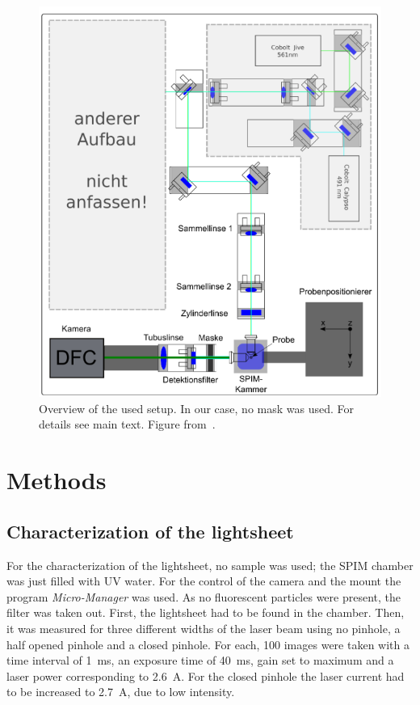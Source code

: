 \begin{figure}[ht]
    \centering
    \includegraphics[width = \textwidth]{Bilder/Setup/setup.png}
    \caption{Overview of the used setup. In our case, no mask was used. For details see main text. Figure from~\cite{Struntz.2017}.}
    \label{fig:setup}
\end{figure}



\section{Methods}\label{sec:methods}
\subsection*{Characterization of the lightsheet}

For the characterization of the lightsheet, no sample was used; the SPIM chamber was just filled with UV water. For the control of the camera and the mount the program \textit{Micro-Manager} was used. As no fluorescent particles were present, the filter was taken out. First, the lightsheet had to be found in the chamber. Then, it was measured for three different widths of the laser beam using no pinhole, a half opened pinhole and a closed pinhole. For each, 100 images were taken with a time interval of \SI{1}{\milli\second}, an exposure time of \SI{40}{\milli\second}, gain set to maximum and a laser power corresponding to \SI{2.6}{\ampere}. For the closed pinhole the laser current had to be increased to \SI{2.7}{\ampere}, due to low intensity. 

